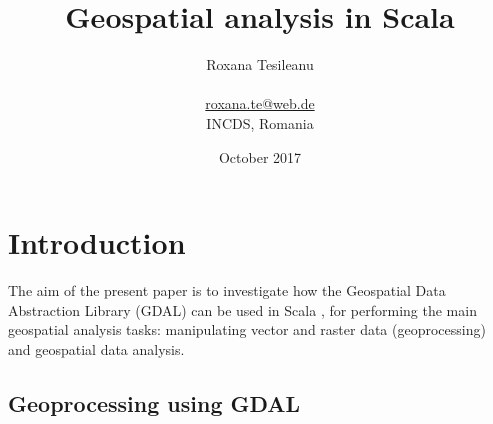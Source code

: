 \documentclass {article}
\title {Geospatial analysis in Scala}
\date {October 2017}
\author {Roxana Tesileanu \\
\\
\href{mailto: roxana.te@web.de}{roxana.te@web.de} \\
INCDS, Romania}
\begin{document}
	\maketitle

\tableofcontents

\section {Introduction}

The aim of the present paper is to investigate how the Geospatial Data Abstraction Library (GDAL) \cite{osgeo_gdal_nodate} can be used in Scala \cite{epfl_scala_2017}, for performing the main geospatial analysis tasks: manipulating vector and raster data (geoprocessing) and geospatial data analysis.
  
\subsection {Geoprocessing using GDAL}
\end{document}
